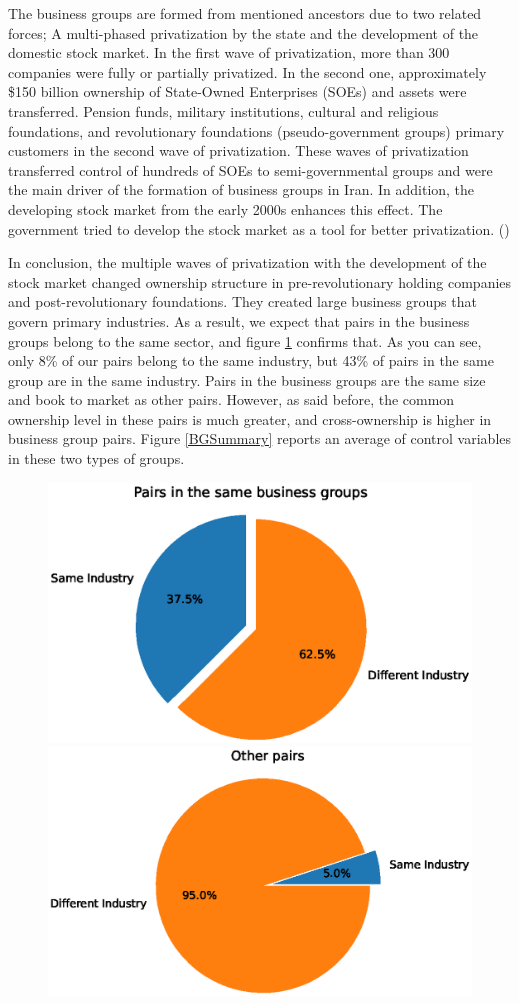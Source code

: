 \documentclass[12pt, a4paper]{article}
\begin{document}
The business groups are formed from mentioned ancestors due to two related forces; A multi-phased privatization by the state and the development of the domestic stock market. In the first wave of privatization, more than 300 companies were fully or partially privatized. In the second one, approximately  \$150 billion ownership of State-Owned Enterprises (SOEs) and assets were transferred.  
Pension funds, military institutions, cultural and religious foundations, and revolutionary foundations (pseudo-government groups) primary customers in the second wave of privatization. These waves of privatization transferred control of hundreds of SOEs to
semi-governmental groups and were the main driver of the formation of business groups in Iran. In addition, the developing stock market from the early 2000s enhances this effect. The government tried to develop the stock market as a tool for better privatization. 
(\cite{Aliabadi2022})

In conclusion, the multiple waves of privatization with the development of the stock market changed ownership structure in pre-revolutionary holding companies and post-revolutionary foundations. They created large business groups that govern primary industries. As a result, we expect that pairs in the business groups belong to the same sector, and figure \ref{sameIndustryinBG} confirms that. As you can see, only 8\% of our pairs belong to the same industry, but 43\% of pairs in the same group are in the same industry. Pairs in the business groups are the same size and book to market as other pairs. However, as said before, the common ownership level in these pairs is much greater, and cross-ownership is higher in business group pairs. Figure \ref{BGSummary} reports an average of control variables in these two types of groups.


\begin{figure}[htbp]
	\caption{}
	\label{sameIndustryinBG}
	\centering
	\includegraphics[width=0.48\linewidth]{Output/sameIndustryinBG.eps}
	\includegraphics[width=0.48\linewidth]{Output/sameIndustryNoinBG.eps}
\end{figure}
\end{document}
